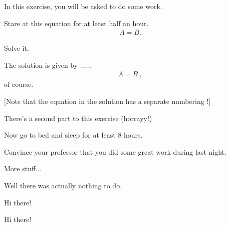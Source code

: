 \documentclass[11pt,a4paper]{article}
\begin{document}
\MakeUebungHeader




In this exercise, you will be asked to do some work.


\begin{exenumerate}
\item Stare at this equation for at least half an hour.
  \begin{align}
    A = B.
  \end{align}

\item Solve it.

  \begin{loesung}
    The solution is given by ...... 
    \begin{align}
      A=B\ ,
    \end{align}
    of course.

    [Note that the equation in the solution has a separate numbering !]
  \end{loesung}
\end{exenumerate}

There's a second part to this exercise (horrayy!)

\begin{exenumerate} %
\item Now go to bed and sleep for at least 8 hours.
\item Convince your professor that you did some great work during last night.
\end{exenumerate}



More stuff...

\begin{solution}
  Well there was actually nothing to do.
\end{solution}


Hi there!


Hi there!
\end{document}
